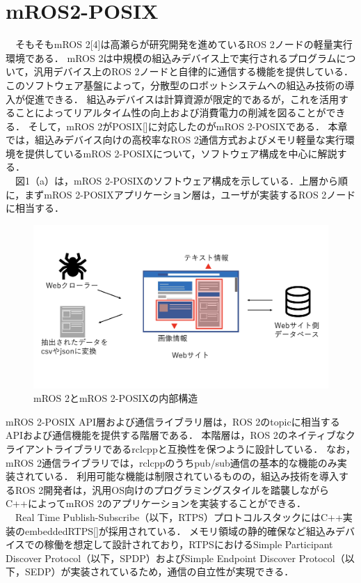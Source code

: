 \documentclass[11pt]{ujarticle}
\begin{document}
\section{mROS2-POSIX}
　そもそもmROS 2[4]は高瀬らが研究開発を進めているROS 2ノードの軽量実行環境である．
mROS 2は中規模の組込みデバイス上で実行されるプログラムについて，汎用デバイス上のROS 2ノードと自律的に通信する機能を提供している．
このソフトウェア基盤によって，分散型のロボットシステムへの組込み技術の導入が促進できる．
組込みデバイスは計算資源が限定的であるが，これを活用することによってリアルタイム性の向上および消費電力の削減を図ることができる．
そして，mROS 2がPOSIX[]に対応したのがmROS 2-POSIXである．
本章では，組込みデバイス向けの高校率なROS 2通信方式およびメモリ軽量な実行環境を提供しているmROS 2-POSIXについて，ソフトウェア構成を中心に解説する．
\\　図1（a）は，mROS 2-POSIXのソフトウェア構成を示している．上層から順に，まずmROS 2-POSIXアプリケーション層は，ユーザが実装するROS 2ノードに相当する．
\begin{figure}[h]
	\includegraphics[width=0.9\linewidth]{./src/selenium.png}
	\caption{mROS 2とmROS 2-POSIXの内部構造}
  \label{fig:arch}
\end{figure}
mROS 2-POSIX API層および通信ライブラリ層は，ROS 2のtopicに相当するAPIおよび通信機能を提供する階層である．
本階層は，ROS 2のネイティブなクライアントライブラリであるrclcppと互換性を保つように設計している．
なお，mROS 2通信ライブラリでは，rclcppのうちpub/sub通信の基本的な機能のみ実装されている．
利用可能な機能は制限されているものの，組込み技術を導入するROS 2開発者は，汎用OS向けのプログラミングスタイルを踏襲しながらC++によってmROS 2のアプリケーションを実装することができる．
\\　Real Time Publish-Subscribe（以下，RTPS）プロトコルスタックにはC++実装のembeddedRTPS[]が採用されている．
メモリ領域の静的確保など組込みデバイスでの稼働を想定して設計されており，RTPSにおけるSimple Participant Discover Protocol（以下，SPDP）およびSimple Endpoint Discover Protocol（以下，SEDP）が実装されているため，通信の自立性が実現できる．
\end{document}

